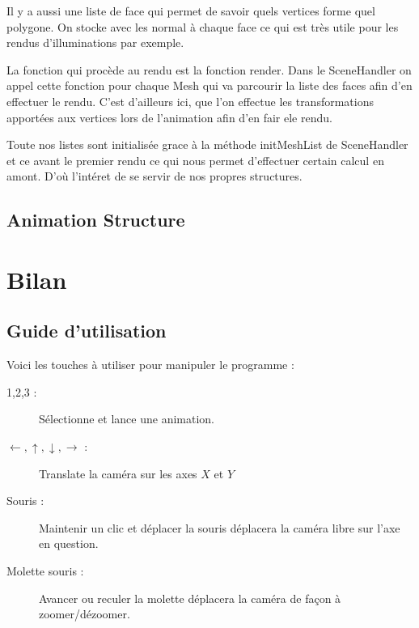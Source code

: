 \documentclass[a4paper]{report}
\begin{document}
    Il y a aussi une liste de face qui permet de savoir quels vertices forme quel polygone. On stocke avec les normal à chaque face ce qui est très utile pour les rendus d'illuminations par exemple.

    La fonction qui procède au rendu est la fonction render. Dans le SceneHandler on appel cette fonction pour chaque Mesh qui va parcourir la liste des faces afin d'en effectuer le rendu. C'est d'ailleurs ici, que l'on effectue les transformations apportées aux vertices lors de l'animation afin d'en fair ele rendu.

    Toute nos listes sont initialisée grace à la méthode initMeshList de SceneHandler et ce avant le premier rendu ce qui nous permet d'effectuer certain calcul en amont. D'où l'intéret de se servir de nos propres structures.

    \section{Animation Structure}

\par


\newpage
\chapter{Bilan}
\section{Guide d'utilisation}
Voici les touches à utiliser pour manipuler le programme :
\begin{description}
	\item[1,2,3 :] Sélectionne et lance une animation.
	\item[$\leftarrow,\uparrow,\downarrow,\rightarrow$ :] Translate la caméra sur les axes $X$ et $Y$
	\item[Souris :] Maintenir un clic et déplacer la souris déplacera la caméra libre sur l'axe en question.
	\item[Molette souris :] Avancer ou reculer la molette déplacera la caméra de façon à zoomer/dézoomer.
\end{description}
\end{document}
